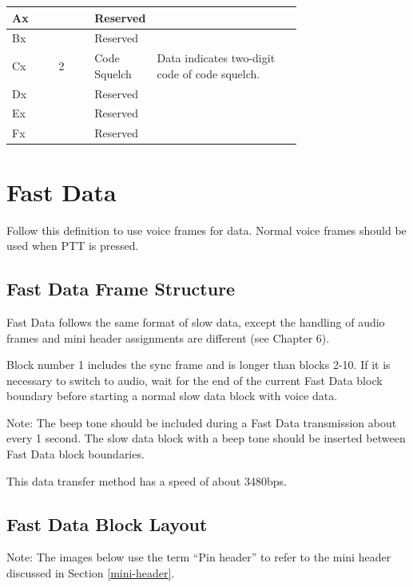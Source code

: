 \documentclass[10pt]{report}
\begin{document}
\begin{table}[h]
\begin{tabular}{|p{0.07\linewidth}|c|p{0.15\linewidth}|p{0.5\linewidth}|}
    Ax &        & Reserved & \\ \hline
    Bx &        & Reserved & \\ \hline

    Cx & 2      & Code Squelch & Data indicates two-digit code of code
    squelch. \\ \hline

    Dx &        & Reserved & \\ \hline
    Ex &        & Reserved & \\ \hline
    Fx &        & Reserved & \\ \hline
  \end{tabular}
\end{table}

\setcounter{chapter}{6}
\chapter{Fast Data}

Follow this definition to use voice frames for data.  Normal voice
frames should be used when PTT is pressed.

\section{Fast Data Frame Structure}

Fast Data follows the same format of slow data, except the handling of
audio frames and mini header assignments are different (see Chapter
6).

Block number 1 includes the sync frame and is longer than blocks 2-10.
If it is necessary to switch to audio, wait for the end of the current
Fast Data block boundary before starting a normal slow data block with
voice data.

Note: The beep tone should be included during a Fast Data transmission
about every 1 second.  The slow data block with a beep tone should be
inserted between Fast Data block boundaries.

This data transfer method has a speed of about 3480bps.

\section{Fast Data Block Layout}

Note: The images below use the term ``Pin header'' to refer to the
mini header discussed in Section \ref{mini-header}.
\end{document}
